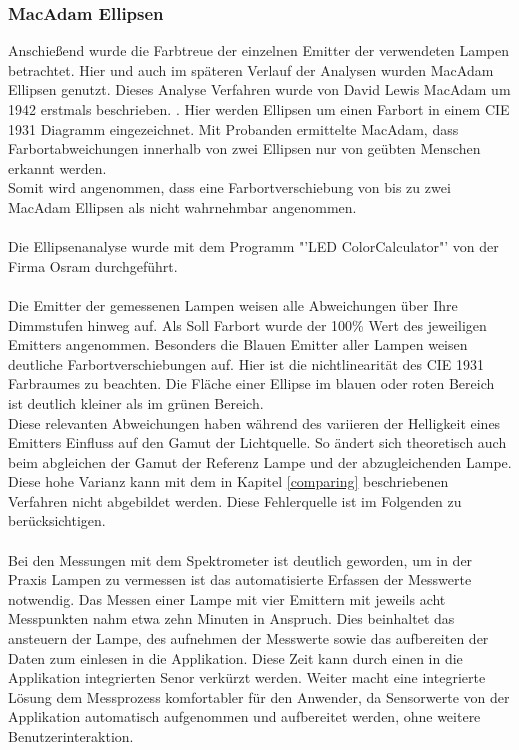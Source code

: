 \documentclass[11pt]{scrartcl}
\begin{document}
\subsubsection{MacAdam Ellipsen}
Anschießend wurde die Farbtreue der einzelnen Emitter der verwendeten Lampen betrachtet. Hier und auch im späteren Verlauf der Analysen wurden MacAdam Ellipsen
genutzt. Dieses Analyse Verfahren wurde von David Lewis MacAdam um 1942 erstmals beschrieben. \cite{macAdam}. Hier werden Ellipsen um einen Farbort in einem CIE
1931 Diagramm eingezeichnet. Mit Probanden ermittelte MacAdam, dass Farbortabweichungen innerhalb von zwei Ellipsen nur von geübten Menschen erkannt werden.\\
Somit wird angenommen, dass eine Farbortverschiebung von bis zu zwei MacAdam Ellipsen als nicht wahrnehmbar angenommen.\\ %
\\
Die Ellipsenanalyse wurde mit dem Programm "'LED ColorCalculator"' von der Firma Osram durchgeführt. \cite{osram}\\
\\
Die Emitter der gemessenen Lampen weisen alle Abweichungen über Ihre Dimmstufen hinweg auf. Als Soll Farbort wurde der 100\% Wert des jeweiligen Emitters
angenommen. Besonders die Blauen Emitter aller Lampen weisen deutliche Farbortverschiebungen auf. Hier ist die nichtlinearität des CIE 1931 Farbraumes zu
beachten. Die Fläche einer Ellipse im blauen oder roten Bereich ist deutlich kleiner als im grünen Bereich.\\
Diese relevanten Abweichungen haben während des variieren der Helligkeit eines Emitters Einfluss auf den Gamut der Lichtquelle. So ändert sich theoretisch auch
beim abgleichen der Gamut der Referenz Lampe und der abzugleichenden Lampe. Diese hohe Varianz kann mit dem in Kapitel \ref{comparing} beschriebenen Verfahren
nicht abgebildet werden. Diese Fehlerquelle ist im Folgenden zu berücksichtigen.\\
\\
Bei den Messungen mit dem Spektrometer ist deutlich geworden, um in der Praxis Lampen zu vermessen ist das automatisierte Erfassen der Messwerte notwendig. Das
Messen einer Lampe mit vier Emittern mit jeweils acht Messpunkten nahm etwa zehn Minuten in Anspruch. Dies beinhaltet das ansteuern der Lampe, des aufnehmen der
Messwerte sowie das aufbereiten der Daten zum einlesen in die Applikation. Diese Zeit kann durch einen in die Applikation integrierten Senor verkürzt werden.
Weiter macht eine integrierte Lösung dem Messprozess komfortabler für den Anwender, da Sensorwerte von der Applikation automatisch aufgenommen und aufbereitet
werden, ohne weitere Benutzerinteraktion.
\end{document}
